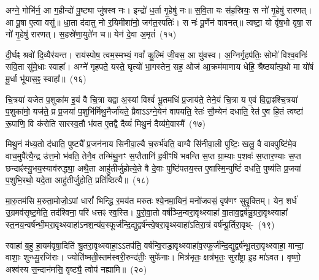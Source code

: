 {\anuvakamend[{व॒पे॒त्प्र॒जा\-प॑तिं॒ वै दधा॑ति पू॒षा त्रीणि॑ च}]}%

अग्ने॒ गोभि॑र्न॒ आ ग॒हीन्दो॑ पु॒ष्ट्या जु॑षस्व नः। इन्द्रो॑ ध॒र्ता गृ॒हेषु॑ नः॥ स॒वि॒ता यः स॑ह॒स्रियः॒ स नो॑ गृ॒हेषु॑ रारणत्। आ पू॒षा ए॒त्वा वसु॑॥ धा॒ता द॑दातु नो र॒यिमीशा॑नो॒ जग॑त॒स्पतिः॑। स नः॑ पू॒र्णेन॑ वावनत्॥ त्वष्टा॒ यो वृ॑ष॒भो वृषा॒ स नो॑ गृ॒हेषु॑ रारणत्। स॒हस्रे॑णा॒युते॑न च॥ येन॑ दे॒वा अ॒मृतं॑~(१५)

दी॒र्घꣴ श्रवो॑ दि॒व्यैर॑यन्त। राय॑स्पोष॒ त्वम॒स्मभ्यं॒ गवां᳚ कु॒ल्मिं जी॒वस॒ आ यु॑वस्व। अ॒ग्निर्गृ॒हप॑तिः॒ सोमो॑ विश्व॒वनिः॑ सवि॒ता सु॑\-मे॒धाः स्वाहा᳚। अग्ने॑ गृहपते॒ यस्ते॒ घृत्यो॑ भा॒गस्तेन॒ सह॒ ओज॑ आ॒\-क्रम॑\-मा\-णाय धेहि॒ श्रैष्ठ्या᳚त्प॒थो मा यो॑षं मू॒र्धा भू॑यास॒ꣴ॒ स्वाहा᳚॥~(१६)

{\anuvakamend[{अ॒मृत॑म॒ष्टात्रिꣳ॑शच्च}]}%

चि॒त्रया॑ यजेत प॒शुका॑म इ॒यं वै चि॒त्रा यद्वा अ॒स्यां विश्वं॑ भू॒तमधि॑ प्र॒जाय॑ते॒ तेने॒यं चि॒त्रा य ए॒वं वि॒द्वाꣴश्चि॒त्रया॑ प॒शुका॑मो॒ यज॑ते॒ प्र प्र॒जया॑ प॒शुभि॑र्मिथु॒नैर्जा॑यते॒ प्रैवा\-ऽऽ\-ग्ने॒येन॑ वापयति॒ रेतः॑ सौ॒म्येन॑ दधाति॒ रेत॑ ए॒व हि॒तं त्वष्टा॑ रू॒पाणि॒ वि क॑रोति सारस्व॒तौ भ॑वत ए॒तद्वै दैव्यं॑ मिथु॒नं दैव्य॑मे॒वास्मै॑~(१७)

मिथु॒नं म॑ध्य॒तो द॑धाति॒ पुष्ट्यै᳚ प्र॒जन॑नाय सिनीवा॒ल्यै च॒रुर्भ॑वति॒ वाग्वै सि॑नीवा॒ली पुष्टिः॒ खलु॒ वै वाक्पुष्टि॑मे॒व वाच॒मुपै᳚त्यै॒न्द्र उ॑त्त॒मो भ॑वति॒ तेनै॒व तन्मि॑थु॒नꣳ स॒प्तैतानि॑ ह॒वीꣳषि॑ भवन्ति स॒प्त ग्रा॒म्याः प॒शवः॑ स॒प्तार॒ण्याः स॒प्त छन्दाꣴ॑स्यु॒भय॒स्याव॑रुद्ध्या॒ अथै॒ता आहु॑तीर्जुहोत्ये॒ते वै दे॒वाः पुष्टि॑पतय॒स्त ए॒वास्मि॒न्पुष्टिं॑ दधति॒ पुष्य॑ति प्र॒जया॑ प॒शुभि॒रथो॒ यदे॒ता आहु॑तीर्जु॒होति॒ प्रति॑ष्ठित्यै॥~(१८)

{\anuvakamend[{अ॒स्मै॒ त ए॒व द्वाद॑श च}]}%

मा॒रु॒तम॑सि म॒रुता॒मोजो॒\-ऽपां धारां᳚ भिन्द्धि र॒मय॑त मरुतः श्ये॒न\-मा॒यिनं॒ मनो॑जवसं॒ वृष॑णꣳ सुवृ॒क्तिम्। येन॒ शर्ध॑ उ॒ग्र\-मव॑\-सृष्ट॒मेति॒ तद॑श्विना॒ परि॑ धत्तꣴ स्व॒स्ति। पु॒रो॒\-वा॒तो वर्\mbox{}ष॑ञ्जि॒न्वरा॒\-वृथ्\-स्वाहा॑ वा॒ता\-व॒द्वर्\mbox{}ष॑न्नु॒ग्ररा॒वृथ्\-स्वाहा᳚ स्त॒न\-य॒न्वर्\mbox{}ष॑न्भी॒म\-रा॒\-वृथ्\-स्वाहा॑\-ऽन\-श॒न्य॑व॒\-स्फूर्ज॑न्दि॒द्युद्वर्\mbox{}ष॑न्त्वे॒ष\-रा॒\-वृथ्\-स्वाहा॑\-ऽतिरा॒त्रं वर्\mbox{}ष॑न्पू॒र्तिरा॒वृथ्-~(१९)

स्वाहा॑ ब॒हु हा॒यम॑वृषा॒दिति॑ श्रु॒तरा॒वृथ्\-स्वाहा॒\-ऽऽ\-तप॑ति॒ वर्\mbox{}ष॑न्वि॒राडा॒वृथ्\-स्वाहा॑\-व॒स्फूर्ज॑न्दि॒द्युद्वर्\mbox{}ष॑न्भू॒तरा॒वृथ्\-स्वाहा॒ मान्दा॒ वाशाः॒ शुन्ध्यू॒रजि॑राः। ज्योति॑ष्मती॒स्तम॑स्वरी॒रुन्द॑तीः॒ सुफे॑नाः। मित्र॑भृतः॒ क्षत्र॑भृतः॒ सुरा᳚ष्ट्रा इ॒ह मा॑\-ऽवत। वृष्णो॒ अश्व॑स्य स॒न्दान॑मसि॒ वृष्ट्यै॒ त्वोप॑ नह्यामि॥~(२०)


